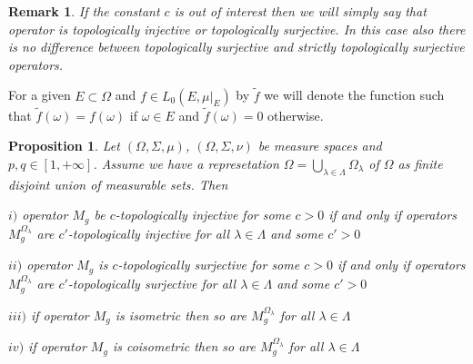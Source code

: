\documentclass[12pt]{article}
\newtheorem{proposition}[theorem]{Proposition}
\newtheorem{remark}[theorem]{Remark}
\begin{document}
\begin{remark} If the constant $c$ is out of interest then we will simply say that operator is topologically injective or topologically surjective. In this case also there is no difference between topologically surjective and strictly topologically surjective operators.
\end{remark}

For a given $E\subset \Omega$ and $f\in L_0(E,\mu|_{E})$ by $\widetilde{f}$ we will denote the function such that $\widetilde{f}(\omega)=f(\omega)$ if $\omega\in E$ and $\widetilde{f}(\omega)=0$ otherwise.

\begin{proposition}\label{MultOpDecompDecomp} Let $(\Omega,\Sigma,\mu)$, $(\Omega,\Sigma,\nu)$ be measure spaces and $p,q\in[1,+\infty]$. Assume we have a represetation $\Omega=\bigcup_{\lambda\in\Lambda}\Omega_\lambda$ of $\Omega$ as finite disjoint union of measurable sets. Then

$i)$ operator $M_g$ be $c$-topologically injective for some $c>0$ if and only if operators $M_g^{\Omega_\lambda}$ are $c'$-topologically injective for all $\lambda\in\Lambda$ and some $c'>0$

$ii)$ operator $M_g$ is $c$-topologically surjective for some $c>0$ if and only if operators $M_g^{\Omega_\lambda}$ are $c'$-topologically surjective for all $\lambda\in\Lambda$ and some $c'>0$

$iii)$ if operator $M_g$ is isometric then so are $M_g^{\Omega_\lambda}$ for all $\lambda\in\Lambda$

$iv)$ if operator $M_g$ is coisometric then so are $M_g^{\Omega_\lambda}$ for all $\lambda\in\Lambda$

\end{proposition}
\end{document}
